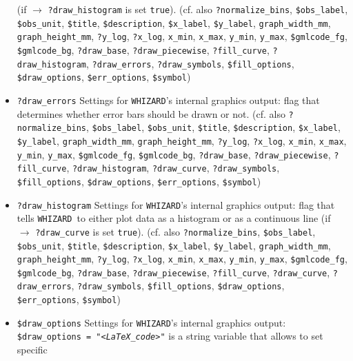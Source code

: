 \documentclass[12pt]{book}
\newcommand{\ttt}[1]{\texttt{#1}}
\newcommand{\whizard}{\texttt{WHIZARD}}
\begin{document}
\begin{itemize}
(if $\to$ \ttt{?draw\_histogram} is set \ttt{true}). (cf. also
\ttt{?normalize\_bins}, \ttt{\$obs\_label}, \ttt{\$obs\_unit}, 
\ttt{\$title}, \ttt{\$description}, \ttt{\$x\_label},
\ttt{\$y\_label}, \ttt{graph\_width\_mm}, \ttt{graph\_height\_mm},
\ttt{?y\_log}, \ttt{?x\_log}, \ttt{x\_min}, \ttt{x\_max}, 
\ttt{y\_min}, \ttt{y\_max}, \newline \ttt{\$gmlcode\_fg}, \ttt{\$gmlcode\_bg},
\ttt{?draw\_base}, \ttt{?draw\_piecewise},
\ttt{?fill\_curve}, \ttt{?draw\_histogram}, \ttt{?draw\_errors},
\ttt{?draw\_symbols}, \ttt{\$fill\_options}, \ttt{\$draw\_options},
\ttt{\$err\_options}, \ttt{\$symbol})
\item
\ttt{?draw\_errors} \newline
Settings for \whizard's internal graphics output: flag that determines
whether error bars should be drawn or not. (cf. also
\ttt{?normalize\_bins}, \ttt{\$obs\_label}, \ttt{\$obs\_unit}, 
\ttt{\$title}, \ttt{\$description}, \ttt{\$x\_label},
\ttt{\$y\_label}, \ttt{graph\_width\_mm}, \ttt{graph\_height\_mm},
\ttt{?y\_log}, \ttt{?x\_log}, \ttt{x\_min}, \ttt{x\_max}, 
\ttt{y\_min}, \ttt{y\_max}, \ttt{\$gmlcode\_fg}, \ttt{\$gmlcode\_bg},
\ttt{?draw\_base}, \ttt{?draw\_piecewise},
\ttt{?fill\_curve}, \ttt{?draw\_histogram}, \ttt{?draw\_curve},
\ttt{?draw\_symbols}, \ttt{\$fill\_options}, \newline 
\ttt{\$draw\_options}, \ttt{\$err\_options}, \ttt{\$symbol})
\item
\ttt{?draw\_histogram} \newline
Settings for \whizard's internal graphics output: flag that tells
\whizard\ to either plot data as a histogram or as a continuous
line (if $\to$ \ttt{?draw\_curve} is set \ttt{true}). (cf. also
\ttt{?normalize\_bins}, \ttt{\$obs\_label}, \ttt{\$obs\_unit}, 
\ttt{\$title}, \ttt{\$description}, \ttt{\$x\_label},
\ttt{\$y\_label}, \ttt{graph\_width\_mm}, \ttt{graph\_height\_mm},
\ttt{?y\_log}, \ttt{?x\_log}, \ttt{x\_min}, \ttt{x\_max}, 
\ttt{y\_min}, \ttt{y\_max}, \newline \ttt{\$gmlcode\_fg}, \ttt{\$gmlcode\_bg},
\ttt{?draw\_base}, \ttt{?draw\_piecewise},
\ttt{?fill\_curve}, \ttt{?draw\_curve}, \ttt{?draw\_errors},
\ttt{?draw\_symbols}, \ttt{\$fill\_options}, \ttt{\$draw\_options},
\ttt{\$err\_options}, \ttt{\$symbol})
\item
\ttt{\$draw\_options} \newline
Settings for \whizard's internal graphics output: \ttt{\$draw\_options
= "{\em <LaTeX\_code>}"} is a string variable that allows to set specific

\end{itemize}
\end{document}
